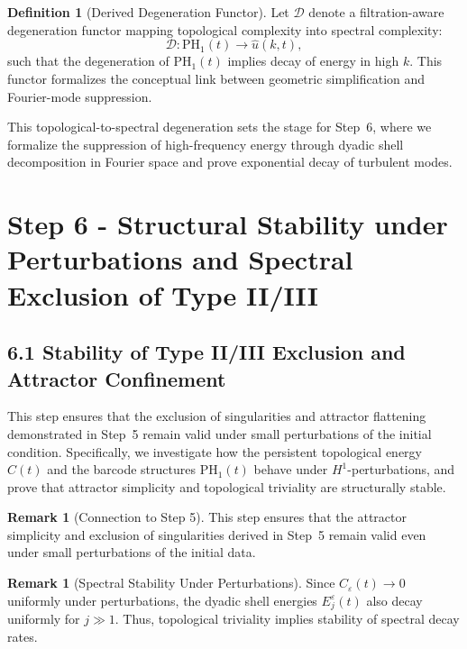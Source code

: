\documentclass[11pt]{article}
\theoremstyle{definition}
\newtheorem{definition}[theorem]{Definition}
\newtheorem{remark}[theorem]{Remark}
\begin{document}
\begin{definition}[Derived Degeneration Functor]
Let $\mathcal{D}$ denote a filtration-aware degeneration functor mapping topological complexity into spectral complexity:
\[
\mathcal{D} : \mathrm{PH}_1(t) \longrightarrow \widehat{u}(k, t),
\]
such that the degeneration of $\mathrm{PH}_1(t)$ implies decay of energy in high $k$. This functor formalizes the conceptual link between geometric simplification and Fourier-mode suppression.
\end{definition}

This topological-to-spectral degeneration sets the stage for Step~6, where we formalize the suppression of high-frequency energy through dyadic shell decomposition in Fourier space and prove exponential decay of turbulent modes.



\section{Step 6 - Structural Stability under Perturbations and Spectral Exclusion of Type II/III}
\label{sec:step6}

\subsection*{6.1 Stability of Type II/III Exclusion and Attractor Confinement}

This step ensures that the exclusion of singularities and attractor flattening demonstrated in Step~5 remain valid under small perturbations of the initial condition. Specifically, we investigate how the persistent topological energy $C(t)$ and the barcode structures $\mathrm{PH}_1(t)$ behave under $H^1$-perturbations, and prove that attractor simplicity and topological triviality are structurally stable.

\begin{remark}[Connection to Step 5]
This step ensures that the attractor simplicity and exclusion of singularities derived in Step~5 remain valid even under small perturbations of the initial data.
\end{remark}

\begin{remark}[Spectral Stability Under Perturbations]
Since $C_\varepsilon(t) \to 0$ uniformly under perturbations, the dyadic shell energies $E_j^\varepsilon(t)$ also decay uniformly for $j \gg 1$. Thus, topological triviality implies stability of spectral decay rates.
\end{remark}
\end{document}
